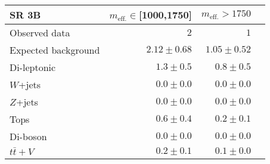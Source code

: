 \begin{tabular*}{\textwidth}{@{\extracolsep{\fill}}lrrr}
\toprule
\textbf{SR 3B} & $m_{\mathrm{eff.}}\in$[1000,1750] & $m_{\mathrm{eff.}}>1750$ \\
\midrule
Observed data          & $2$              & $1$                    \\
\midrule
Expected background         & $2.12 \pm 0.68$          & $1.05 \pm 0.52$              \\
\midrule
        Di-leptonic         & $1.3 \pm 0.5$          & $0.8 \pm 0.5$              \\
        $W$+jets         & $0.0 \pm 0.0$          & $0.0 \pm 0.0$              \\
        $Z$+jets         & $0.0 \pm 0.0$          & $0.0 \pm 0.0$              \\
        Tops         & $0.6 \pm 0.4$          & $0.2 \pm 0.1$              \\
        Di-boson         & $0.0 \pm 0.0$          & $0.0 \pm 0.0$              \\
        $t\bar{t}+V$         & $0.2 \pm 0.1$          & $0.1 \pm 0.0$              \\


\bottomrule
\end{tabular*}




